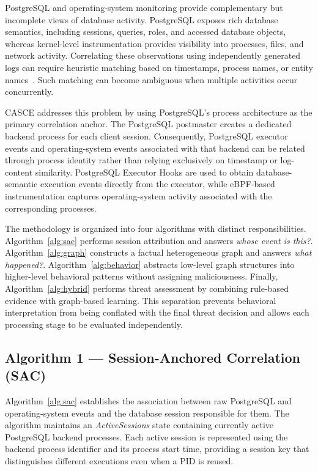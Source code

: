 \documentclass[conference]{IEEEtran}
\begin{document}
PostgreSQL and operating-system monitoring provide complementary but incomplete views of database activity. PostgreSQL exposes rich database semantics, including sessions, queries, roles, and accessed database objects, whereas kernel-level instrumentation provides visibility into processes, files, and network activity. Correlating these observations using independently generated logs can require heuristic matching based on timestamps, process names, or entity names~\cite{omegalog,oneprovenance,alchemist}. Such matching can become ambiguous when multiple activities occur concurrently.

CASCE addresses this problem by using PostgreSQL's process architecture as the primary correlation anchor. The PostgreSQL postmaster creates a dedicated backend process for each client session. Consequently, PostgreSQL executor events and operating-system events associated with that backend can be related through process identity rather than relying exclusively on timestamp or log-content similarity. PostgreSQL Executor Hooks are used to obtain database-semantic execution events directly from the executor, while eBPF-based instrumentation captures operating-system activity associated with the corresponding processes.

The methodology is organized into four algorithms with distinct responsibilities. Algorithm~\ref{alg:sac} performs session attribution and answers \emph{whose event is this?}. Algorithm~\ref{alg:graph} constructs a factual heterogeneous graph and answers \emph{what happened?}. Algorithm~\ref{alg:behavior} abstracts low-level graph structures into higher-level behavioral patterns without assigning maliciousness. Finally, Algorithm~\ref{alg:hybrid} performs threat assessment by combining rule-based evidence with graph-based learning. This separation prevents behavioral interpretation from being conflated with the final threat decision and allows each processing stage to be evaluated independently.

\subsection{Algorithm 1 --- Session-Anchored Correlation (SAC)}
\label{subsec:sac}

Algorithm~\ref{alg:sac} establishes the association between raw PostgreSQL and operating-system events and the database session responsible for them. The algorithm maintains an \textit{ActiveSessions} state containing currently active PostgreSQL backend processes. Each active session is represented using the backend process identifier and its process start time, providing a session key that distinguishes different executions even when a PID is reused.
\end{document}
